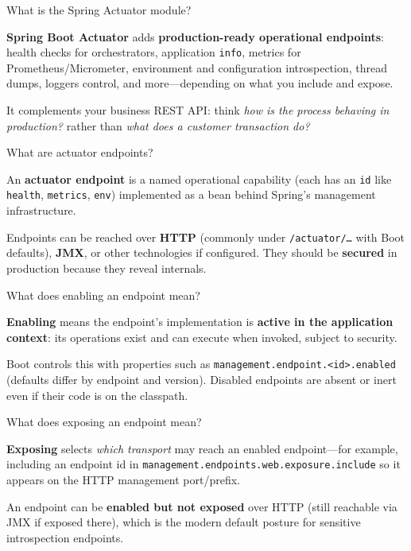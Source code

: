 \question[4]
What is the Spring Actuator module?
\begin{solutionorbox}[1.2in]
  \textbf{Spring Boot Actuator} adds \textbf{production-ready operational endpoints}: health checks for orchestrators, application \texttt{info}, metrics for Prometheus/Micrometer, environment and configuration introspection, thread dumps, loggers control, and more---depending on what you include and expose.

  It complements your business REST API: think \emph{how is the process behaving in production?} rather than \emph{what does a customer transaction do?}
\end{solutionorbox}

\question[4]
What are actuator endpoints?
\begin{solutionorbox}[1.1in]
  An \textbf{actuator endpoint} is a named operational capability (each has an \texttt{id} like \texttt{health}, \texttt{metrics}, \texttt{env}) implemented as a bean behind Spring's management infrastructure.

  Endpoints can be reached over \textbf{HTTP} (commonly under \texttt{/actuator/\ldots} with Boot defaults), \textbf{JMX}, or other technologies if configured. They should be \textbf{secured} in production because they reveal internals.
\end{solutionorbox}

\question[4]
What does enabling an endpoint mean?
\begin{solutionorbox}[1.05in]
  \textbf{Enabling} means the endpoint's implementation is \textbf{active in the application context}: its operations exist and can execute when invoked, subject to security.

  Boot controls this with properties such as \texttt{management.endpoint.<id>.enabled} (defaults differ by endpoint and version). Disabled endpoints are absent or inert even if their code is on the classpath.
\end{solutionorbox}

\question[4]
What does exposing an endpoint mean?
\begin{solutionorbox}[1.05in]
  \textbf{Exposing} selects \emph{which transport} may reach an enabled endpoint---for example, including an endpoint id in \texttt{management.endpoints.web.exposure.include} so it appears on the HTTP management port/prefix.

  An endpoint can be \textbf{enabled but not exposed} over HTTP (still reachable via JMX if exposed there), which is the modern default posture for sensitive introspection endpoints.
\end{solutionorbox}

